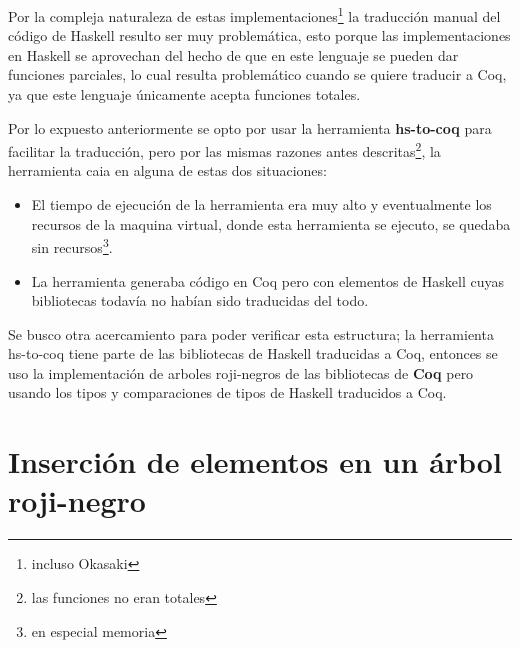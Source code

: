 \documentclass[letterpaper,12pt,oneside]{book}
\newcommand{\coq}{\textbf{Coq}}
\newcommand{\arn}{árbol roji-negro}
\newcommand{\arns}{arboles roji-negros}
\theoremstyle{plain}
\theoremstyle{definition}
\theoremstyle{remark}
\begin{document}
Por la compleja naturaleza de estas implementaciones\footnote{incluso Okasaki} la traducción manual del 
código de Haskell resulto ser muy problemática,
esto porque las implementaciones en Haskell se aprovechan del hecho de que en este lenguaje se pueden dar
funciones parciales, lo cual resulta problemático cuando se quiere traducir a Coq, ya que este lenguaje 
únicamente acepta funciones totales.

Por lo expuesto anteriormente se opto por usar la herramienta \textbf{hs-to-coq} para facilitar la 
traducci\'on, pero por las mismas razones antes descritas\footnote{las funciones no eran totales},
la herramienta caia en alguna de estas dos situaciones:

\begin{itemize}
    \item El tiempo de ejecuci\'on de la herramienta era muy alto y eventualmente los recursos de la 
    maquina virtual, donde esta herramienta se ejecuto, se quedaba sin recursos\footnote{en especial 
    memoria}.
    \item La herramienta generaba c\'odigo en Coq pero con elementos de Haskell cuyas bibliotecas todavía
    no habían sido traducidas del todo.
\end{itemize}{}

Se busco otra acercamiento para poder verificar esta estructura; la herramienta hs-to-coq tiene parte de 
las bibliotecas de Haskell traducidas a Coq, entonces se uso la implementación de {\arns} de las 
bibliotecas de {\coq}\cite{MSetRBT} pero usando los tipos y comparaciones de tipos de Haskell traducidos 
a Coq.

\section{Inserción de elementos en un {\arn}}
\end{document}
